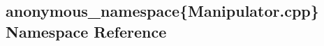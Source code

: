 \hypertarget{namespaceanonymous__namespace_02Manipulator_8cpp_03}{\subsection{anonymous\-\_\-namespace\{Manipulator.\-cpp\} Namespace Reference}
\label{namespaceanonymous__namespace_02Manipulator_8cpp_03}
}

